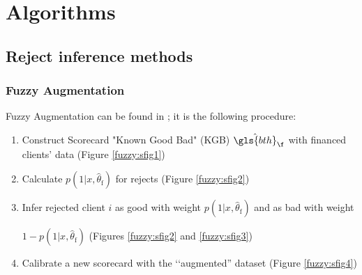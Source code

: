 
\chapter{Algorithms} \label{app1}

\minitoc

\section{Reject inference methods} \label{app1:reject}

\subsection{Fuzzy Augmentation} \label{fuzzy}

Fuzzy Augmentation can be found in \cite{economix}; it is the following procedure:
\begin{enumerate}
\item Construct Scorecard "Known Good Bad" (KGB) $\hat{\gls{bth}}_\f$ with financed clients' data (Figure \ref{fuzzy:sfig1})
\item Calculate $p(1|x,\hat{\theta}_{\text{f}})$ for rejects (Figure \ref{fuzzy:sfig2})
\item Infer rejected client $i$ as good with weight $p(1|x,\hat{\theta}_{\text{f}})$ and as bad with weight {\begin{sloppypar} $1-p(1|x,\hat{\theta}_{\text{f}})$ (Figures \ref{fuzzy:sfig2} and \ref{fuzzy:sfig3}) \end{sloppypar} }
\item Calibrate a new scorecard with the ‘‘augmented'' dataset (Figure \ref{fuzzy:sfig4})
\end{enumerate}

